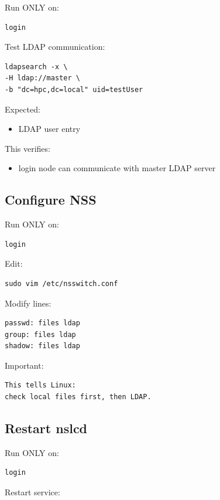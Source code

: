 \documentclass[11pt]{article}
\begin{document}
Run ONLY on:

\begin{verbatim}
login
\end{verbatim}

Test LDAP communication:

\begin{verbatim}
ldapsearch -x \
-H ldap://master \
-b "dc=hpc,dc=local" uid=testUser
\end{verbatim}

Expected:
\begin{itemize}
\item LDAP user entry
\end{itemize}

This verifies:
\begin{itemize}
\item login node can communicate with master LDAP server
\end{itemize}
\subsection{Configure NSS}
\label{sec:org76651af}

Run ONLY on:

\begin{verbatim}
login
\end{verbatim}

Edit:

\begin{verbatim}
sudo vim /etc/nsswitch.conf
\end{verbatim}

Modify lines:

\begin{verbatim}
passwd: files ldap
group: files ldap
shadow: files ldap
\end{verbatim}

Important:

\begin{verbatim}
This tells Linux:
check local files first, then LDAP.
\end{verbatim}
\subsection{Restart nslcd}
\label{sec:orgbbcae1f}

Run ONLY on:

\begin{verbatim}
login
\end{verbatim}

Restart service:
\end{document}
